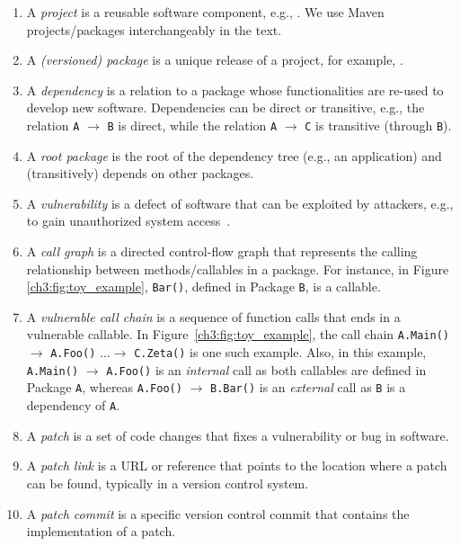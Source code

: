 \begin{enumerate}
\itemsep0em
    \item A \textit{project} is a reusable software component, e.g., . We use Maven projects/packages interchangeably in the text.
    \item A \textit{(versioned) package} is a unique release of a project, for example, .
    \item A \textit{dependency} is a relation to a package whose functionalities are re-used to develop new software. Dependencies can be direct or transitive, e.g., the relation \texttt{A} $\rightarrow$ \texttt{B} is direct, while the relation \texttt{A} $\rightarrow$ \texttt{C} is transitive (through \texttt{B}).
    \item A \textit{root package} is the root of the dependency tree (e.g., an application) and (transitively) depends on other packages.
    \item A \textit{vulnerability} is a defect of software that can be exploited by attackers, e.g., to gain unauthorized system access~\cite{dowd2006art}.
    \item A \textit{call graph} is a directed control-flow graph that represents the calling relationship between methods/callables in a package. For instance, in Figure \ref{ch3:fig:toy_example}, \texttt{Bar()}, defined in Package \texttt{B}, is a callable.
    \item A \textit{vulnerable call chain} is a sequence of function calls that ends in a vulnerable callable. In Figure~\ref{ch3:fig:toy_example}, the call chain \texttt{A.Main()} $\rightarrow$ \texttt{A.Foo()} $\dots \rightarrow$ \texttt{C.Zeta()} is one such example. Also, in this example, \texttt{A.Main()} $\rightarrow$ \texttt{A.Foo()} is an \emph{internal} call as both callables are defined in Package \texttt{A}, whereas \texttt{A.Foo()} $\rightarrow$ \texttt{B.Bar()} is an \emph{external} call as \texttt{B} is a dependency of \texttt{A}.
    \item A \textit{patch} is a set of code changes that fixes a vulnerability or bug in software.
    \item A \textit{patch link} is a URL or reference that points to the location where a patch can be found, typically in a version control system.
    \item A \textit{patch commit} is a specific version control commit that contains the implementation of a patch.
\end{enumerate}

